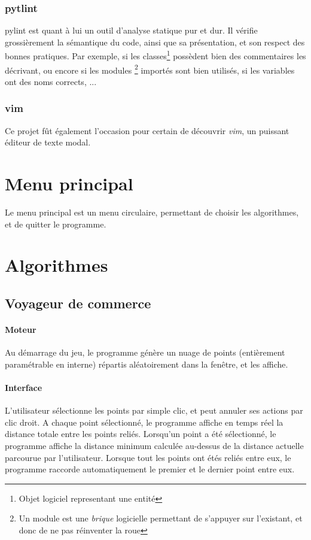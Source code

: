         \subsubsection{pytlint} pylint est quant à lui un outil d'analyse
            statique pur et dur. Il vérifie grossièrement la sémantique du code,
            ainsi que sa présentation, et son respect des bonnes pratiques.
            Par exemple, si les classes\footnote{Objet logiciel representant une entité}
            possèdent bien des commentaires les décrivant, ou encore si les modules
            \footnote{Un module est une \emph{brique} logicielle permettant
            de s'appuyer sur l'existant, et donc de ne pas réinventer la roue}
            importés sont bien utilisés, si les variables ont des noms corrects, ...
        \subsubsection{vim}
            Ce projet fût également l'occasion pour certain de découvrir \emph{vim},
            un puissant éditeur de texte modal.

\section{Menu principal}
    Le menu principal est un menu circulaire,
    permettant de choisir les algorithmes, et de
    quitter le programme.

\section{Algorithmes}
    \subsection{Voyageur de commerce}
        \paragraph{Moteur}
            Au démarrage du jeu, le programme génère un nuage
            de points (entièrement paramétrable en interne)
            répartis aléatoirement dans la fenêtre, et les affiche.
        \paragraph{Interface}
            L'utilisateur sélectionne les points par simple clic,
            et peut annuler ses actions par clic droit.
            A chaque point sélectionné, le programme
            affiche en temps réel la distance totale entre
            les points reliés.
            Lorsqu'un point a été sélectionné, le programme
            affiche la distance minimum calculée au-dessus de
            la distance actuelle parcourue par l'utilisateur.
            Lorsque tout les points ont étés reliés entre eux,
            le programme raccorde automatiquement le premier
            et le dernier point entre eux.

